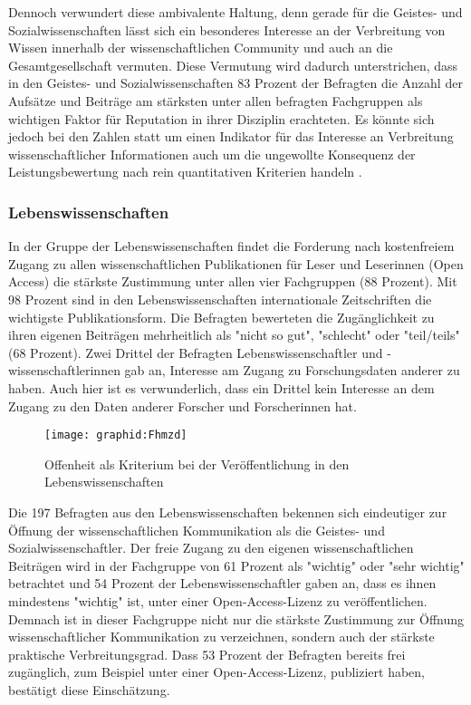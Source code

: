 Dennoch verwundert diese ambivalente Haltung, denn gerade für die Geistes- und Sozialwissenschaften lässt sich ein besonderes Interesse an der Verbreitung von Wissen innerhalb der wissenschaftlichen Community und auch an die Gesamtgesellschaft vermuten. Diese Vermutung wird dadurch unterstrichen, dass in den Geistes- und Sozialwissenschaften 83 Prozent der Befragten die Anzahl der Aufsätze und Beiträge am stärksten unter allen befragten Fachgruppen als wichtigen Faktor für Reputation in ihrer Disziplin erachteten. Es könnte sich jedoch bei den Zahlen statt um einen Indikator für das Interesse an Verbreitung wissenschaftlicher Informationen auch um die ungewollte Konsequenz der Leistungsbewertung nach rein quantitativen Kriterien handeln \cite{Wissenschaftsrat_2015}.

\subsubsection{Lebenswissenschaften}

In der Gruppe der Lebenswissenschaften findet die Forderung nach kostenfreiem Zugang zu allen wissenschaftlichen Publikationen für Leser und Leserinnen (Open Access) die stärkste Zustimmung unter allen vier Fachgruppen (88 Prozent). Mit 98 Prozent sind in den Lebenswissenschaften internationale Zeitschriften die wichtigste Publikationsform. Die Befragten bewerteten die Zugänglichkeit zu ihren eigenen Beiträgen mehrheitlich als "nicht so gut", "schlecht" oder "teil/teils" (68 Prozent). Zwei Drittel der Befragten Lebenswissenschaftler und -wissenschaftlerinnen gab an, Interesse am Zugang zu Forschungsdaten anderer zu haben. Auch hier ist es verwunderlich, dass ein Drittel kein Interesse an dem Zugang zu den Daten anderer Forscher und Forscherinnen hat.

\begin{figure}[h!]
\texttt{[image: graphid:Fhmzd]}
\caption{Offenheit als Kriterium bei der Veröffentlichung in den Lebenswissenschaften}
\end{figure}

Die 197 Befragten aus den Lebenswissenschaften bekennen sich eindeutiger zur Öffnung der wissenschaftlichen Kommunikation als die Geistes- und Sozialwissenschaftler. Der freie Zugang zu den eigenen wissenschaftlichen Beiträgen wird in der Fachgruppe von 61 Prozent als "wichtig" oder "sehr wichtig" betrachtet und 54 Prozent der Lebenswissenschaftler gaben an, dass es ihnen mindestens "wichtig" ist, unter einer Open-Access-Lizenz zu veröffentlichen. Demnach ist in dieser Fachgruppe nicht nur die stärkste Zustimmung zur Öffnung wissenschaftlicher Kommunikation zu verzeichnen, sondern auch der stärkste praktische Verbreitungsgrad. Dass 53 Prozent der Befragten bereits frei zugänglich, zum Beispiel unter einer Open-Access-Lizenz, publiziert haben, bestätigt diese Einschätzung.

